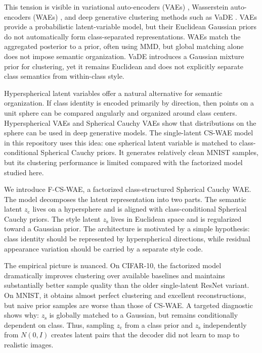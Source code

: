 \documentclass[10pt]{article}
\newcommand{\ours}{F-CS-WAE}
\newcommand{\simple}{CS-WAE}
\newcommand{\zc}{z_{\mathrm{c}}}
\newcommand{\zs}{z_{\mathrm{s}}}
\begin{document}
This tension is visible in variational auto-encoders (VAEs) \citep{kingma2013autoencoding}, Wasserstein auto-encoders (WAEs) \citep{tolstikhin2017wasserstein}, and deep generative clustering methods such as VaDE \citep{jiang2016variational}. VAEs provide a probabilistic latent-variable model, but their Euclidean Gaussian priors do not automatically form class-separated representations. WAEs match the aggregated posterior to a prior, often using MMD, but global matching alone does not impose semantic organization. VaDE introduces a Gaussian mixture prior for clustering, yet it remains Euclidean and does not explicitly separate class semantics from within-class style.

Hyperspherical latent variables offer a natural alternative for semantic organization. If class identity is encoded primarily by direction, then points on a unit sphere can be compared angularly and organized around class centers. Hyperspherical VAEs \citep{davidson2018hyperspherical} and Spherical Cauchy VAEs \citep{sablica2025hyperspherical} show that distributions on the sphere can be used in deep generative models. The single-latent \simple{} model in this repository uses this idea: one spherical latent variable is matched to class-conditional Spherical Cauchy priors. It generates relatively clean MNIST samples, but its clustering performance is limited compared with the factorized model studied here.

We introduce \ours, a factorized class-structured Spherical Cauchy WAE. The model decomposes the latent representation into two parts. The semantic latent $\zc$ lives on a hypersphere and is aligned with class-conditional Spherical Cauchy priors. The style latent $\zs$ lives in Euclidean space and is regularized toward a Gaussian prior. The architecture is motivated by a simple hypothesis: class identity should be represented by hyperspherical directions, while residual appearance variation should be carried by a separate style code.

The empirical picture is nuanced. On CIFAR-10, the factorized model dramatically improves clustering over available baselines and maintains substantially better sample quality than the older single-latent ResNet variant. On MNIST, it obtains almost perfect clustering and excellent reconstructions, but naive prior samples are worse than those of \simple{}. A targeted diagnostic shows why: $\zs$ is globally matched to a Gaussian, but remains conditionally dependent on class. Thus, sampling $\zc$ from a class prior and $\zs$ independently from $N(0,I)$ creates latent pairs that the decoder did not learn to map to realistic images.
\end{document}
